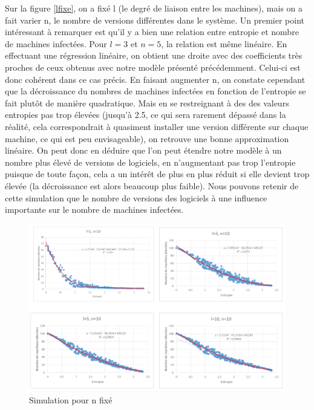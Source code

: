Sur la figure \ref{lfixe}, on a fixé l (le degré de liaison entre les machines), mais on a fait varier n, le nombre de versions différentes dans le système. Un premier point intéressant à remarquer est qu'il y a bien une relation entre entropie et nombre de machines infectées. Pour $l=3$ et $n=5$, la relation est même linéaire. En effectuant une régression linéaire, on obtient une droite avec des coefficients très proches de ceux obtenus avec notre modèle présenté précédemment. Celui-ci est donc cohérent dans ce cas précis.
En faisant augmenter n, on constate cependant que la décroissance du nombres de machines infectées en fonction de l'entropie se fait plutôt de manière quadratique. Mais en se restreignant à des des valeurs entropies pas trop élevées (jusqu'à 2.5, ce qui sera rarement dépassé dans la réalité, cela correspondrait à quasiment installer une version différente sur chaque machine, ce qui est peu envisageable), on retrouve une bonne approximation linéaire. On peut donc en déduire que l'on peut étendre notre modèle à un nombre plus élevé de versions de logiciels, en n'augmentant pas trop l'entropie puisque de toute façon, cela a un intérêt de plus en plus réduit si elle devient trop élevée (la décroissance est alors beaucoup plus faible). Nous pouvons retenir de cette simulation que le nombre de versions des logiciels à une influence importante sur le nombre de machines infectées.


\begin{figure}[!ht]
\centering
     \includegraphics[width=1.0\linewidth]{Paul/python/nfixe.png}
     \caption{Simulation pour n fixé}
     \label{nfixe}
\end{figure}

